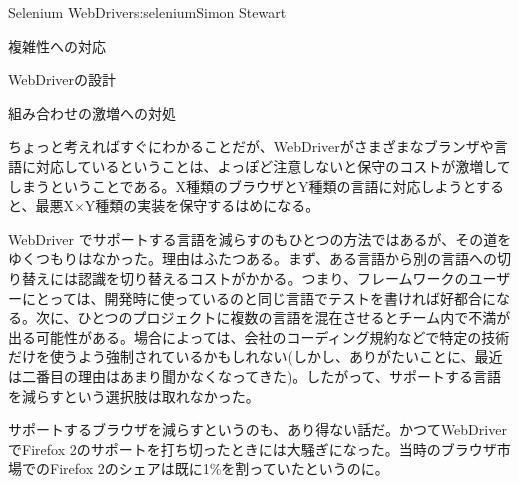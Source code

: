 \begin{aosachapter}{Selenium WebDriver}{s:selenium}{Simon Stewart}
\begin{aosasect1}{複雑性への対応}
\begin{aosasect2}{WebDriverの設計}
\end{aosasect2}

\begin{aosasect2}{組み合わせの激増への対処}

ちょっと考えればすぐにわかることだが、WebDriverがさまざまなブランザや言語に対応しているということは、よっぽど注意しないと保守のコストが激増してしまうということである。X種類のブラウザとY種類の言語に対応しようとすると、最悪X${\times}$Y種類の実装を保守するはめになる。

WebDriver でサポートする言語を減らすのもひとつの方法ではあるが、その道をゆくつもりはなかった。理由はふたつある。まず、ある言語から別の言語への切り替えには認識を切り替えるコストがかかる。つまり、フレームワークのユーザーにとっては、開発時に使っているのと同じ言語でテストを書ければ好都合になる。次に、ひとつのプロジェクトに複数の言語を混在させるとチーム内で不満が出る可能性がある。場合によっては、会社のコーディング規約などで特定の技術だけを使うよう強制されているかもしれない(しかし、ありがたいことに、最近は二番目の理由はあまり聞かなくなってきた)。したがって、サポートする言語を減らすという選択肢は取れなかった。

サポートするブラウザを減らすというのも、あり得ない話だ。かつてWebDriverでFirefox 2のサポートを打ち切ったときには大騒ぎになった。当時のブラウザ市場でのFirefox 2のシェアは既に1\%を割っていたというのに。


\end{aosasect2}
\end{aosasect1}
\end{aosachapter}
